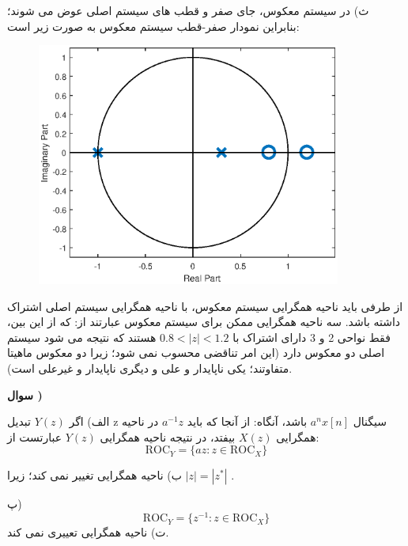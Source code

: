 \documentclass[10pt,letterpaper]{article}
\newcounter{QuestionNumber}
\newcommand{\Q}{
\textbf{
سوال \theQuestionNumber)
}
\stepcounter{QuestionNumber}
}
\begin{document}
ث) در سیستم معکوس، جای صفر و قطب های سیستم اصلی عوض می شوند؛ بنابراین نمودار صفر-قطب سیستم معکوس به صورت زیر است:
\vspace{0.15cm}
\begin{figure}[h!]
\centering
\includegraphics[width=100mm]{PSol12_Q3.eps}
\end{figure}
\vspace{0.15cm}

از طرفی باید ناحیه همگرایی سیستم معکوس، با ناحیه همگرایی سیستم اصلی اشتراک داشته باشد. سه ناحیه همگرایی ممکن برای سیستم معکوس عبارتند از:
که از این بین، فقط نواحی 2 و 3 دارای اشتراک با 
$
0.8<|z|<1.2
$
هستند که نتیجه می شود سیستم اصلی دو معکوس دارد (این امر تناقضی محسوب نمی شود؛ زیرا دو معکوس ماهیتا متفاوتند؛ یکی ناپایدار و علی و دیگری ناپایدار و غیرعلی است).

\Q

الف) اگر 
$
Y(z)
$
 تبدیل z سیگنال 
$
a^nx[n]
$
 باشد، آنگاه:
از آنجا که باید 
$
a^{-1}z
$
 در ناحیه همگرایی $X(z)$ بیفتد، در نتیجه ناحیه همگرایی $Y(z)$ عبارتست از:
$$
\text{ROC}_Y=\{az:z\in\text{ROC}_X\}
$$

ب)
ناحیه همگرایی تغییر نمی کند؛ زیرا 
$
|z|=|z^*|
$
.

پ) 
$$
\text{ROC}_Y=\{z^{-1}:z\in\text{ROC}_X\}
$$
ت)
ناحیه همگرایی تعییری نمی کند.
\end{document}
